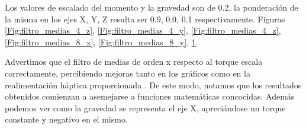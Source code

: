 \begin{figure}[!htb]
   \begin{minipage}{0.33\textwidth}
     \centering
         \caption{ }\label{Fig:filtro_medias_8_x}
   \end{minipage}\hfill
   \begin{minipage}{0.33\textwidth}
     \centering
         \caption{ }\label{Fig:filtro_medias_8_y}
   \end{minipage}
   \begin{minipage}{0.33\textwidth}
     \centering
         \caption{ }\label{Fig:filtro_medias_8_z}
   \end{minipage}\hfill
\end{figure}

Los valores de escalado del momento y la gravedad son de 0.2, la ponderación de la misma en los ejes X, Y, Z resulta ser 0.9, 0.0, 0.1 respectivamente. Figuras \ref{Fig:filtro_medias_4_z},  \ref{Fig:filtro_medias_4_y},  \ref{Fig:filtro_medias_4_z}, \ref{Fig:filtro_medias_8_x},  \ref{Fig:filtro_medias_8_y},  \ref{Fig:filtro_medias_8_z}.

Advertimos que el filtro de medias de orden x respecto al torque escala correctamente, percibiendo mejoras tanto en los gráficos como en la realimentación háptica proporcionada . De este modo, notamos que los resultados obtenidos comienzan a asemejarse a funciones matemáticas concocidas. Además podemos ver como la gravedad se representa el eje X, apreciándose un torque constante y negativo en el mismo.

\begin{figure}[!htb]
   \begin{minipage}{0.33\textwidth}
     \centering
         \caption{ }\label{Fig:filtro_medias_10_x}
   \end{minipage}\hfill
   \begin{minipage}{0.33\textwidth}
     \centering
         \caption{ }\label{Fig:filtro_medias_10_y}
   \end{minipage}
   \begin{minipage}{0.33\textwidth}
     \centering
         \caption{ }\label{Fig:filtro_medias_10_z}
   \end{minipage}\hfill
\end{figure}

